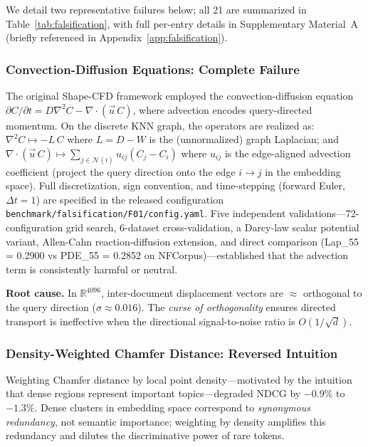 \documentclass[review,1p]{elsarticle}
\newcommand{\R}{\mathbb{R}}
\begin{document}
We detail two representative failures below; all 21 are summarized in Table~\ref{tab:falsification}, with full per-entry details in Supplementary Material~A (briefly referenced in Appendix~\ref{app:falsification}).

\subsubsection{Convection-Diffusion Equations: Complete Failure}

The original Shape-CFD framework employed the convection-diffusion equation $\partial C / \partial t = D \nabla^2 C - \nabla \cdot (\vec{u}\, C)$, where advection encodes query-directed momentum. On the discrete KNN graph, the operators are realized as: $\nabla^2 C \mapsto -L\, C$ where $L = D - W$ is the (unnormalized) graph Laplacian; and $\nabla \cdot (\vec{u}\, C) \mapsto \sum_{j \in \mathcal{N}(i)} u_{ij} (C_j - C_i)$ where $u_{ij}$ is the edge-aligned advection coefficient (project the query direction onto the edge $i \to j$ in the embedding space). Full discretization, sign convention, and time-stepping (forward Euler, $\Delta t = 1$) are specified in the released configuration \texttt{benchmark/falsification/F01/config.yaml}. Five independent validations---72-configuration grid search, 6-dataset cross-validation, a Darcy-law scalar potential variant, Allen-Cahn reaction-diffusion extension, and direct comparison (Lap\_55 = 0.2900 vs PDE\_55 = 0.2852 on NFCorpus)---established that the advection term is consistently harmful or neutral.

\textbf{Root cause.} In $\R^{4096}$, inter-document displacement vectors are $\approx$ orthogonal to the query direction ($\sigma \approx 0.016$). The \textit{curse of orthogonality} ensures directed transport is ineffective when the directional signal-to-noise ratio is $O(1/\sqrt{d})$.

\subsubsection{Density-Weighted Chamfer Distance: Reversed Intuition}

Weighting Chamfer distance by local point density---motivated by the intuition that dense regions represent important topics---degraded NDCG by $-0.9\%$ to $-1.3\%$. Dense clusters in embedding space correspond to \textit{synonymous redundancy}, not semantic importance; weighting by density amplifies this redundancy and dilutes the discriminative power of rare tokens.
\end{document}
